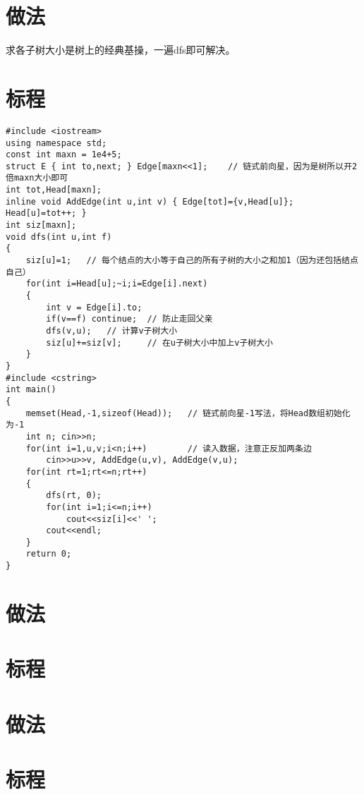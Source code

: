 \documentclass{ctsol}
\begin{document}
\makesolution
\section*{做法}
求各子树大小是树上的经典基操，一遍dfs即可解决。

\section*{标程}
\begin{lstlisting}
#include <iostream>
using namespace std;
const int maxn = 1e4+5;
struct E { int to,next; } Edge[maxn<<1];    // 链式前向星，因为是树所以开2倍maxn大小即可
int tot,Head[maxn];
inline void AddEdge(int u,int v) { Edge[tot]={v,Head[u]}; Head[u]=tot++; }
int siz[maxn];
void dfs(int u,int f)
{
    siz[u]=1;   // 每个结点的大小等于自己的所有子树的大小之和加1（因为还包括结点自己）
    for(int i=Head[u];~i;i=Edge[i].next)
    {
        int v = Edge[i].to;
        if(v==f) continue;  // 防止走回父亲
        dfs(v,u);   // 计算v子树大小
        siz[u]+=siz[v];     // 在u子树大小中加上v子树大小
    }
}
#include <cstring>
int main()
{
    memset(Head,-1,sizeof(Head));   // 链式前向星-1写法，将Head数组初始化为-1
    int n; cin>>n;
    for(int i=1,u,v;i<n;i++)        // 读入数据，注意正反加两条边
        cin>>u>>v, AddEdge(u,v), AddEdge(v,u);
    for(int rt=1;rt<=n;rt++)
    {
        dfs(rt, 0);
        for(int i=1;i<=n;i++)
            cout<<siz[i]<<' ';
        cout<<endl;
    }
    return 0;
}
\end{lstlisting}

\makesolution
\section*{做法}
\section*{标程}

\makesolution
\section*{做法}
\section*{标程}
\end{document}
